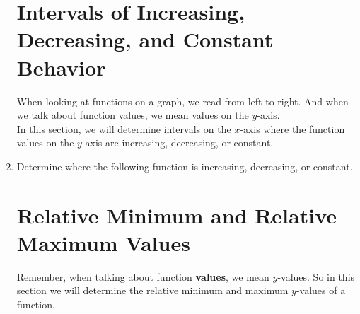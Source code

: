 \documentclass[11pt]{article}
\begin{document}
\begin{enumerate}
\section{Intervals of Increasing, Decreasing, and Constant Behavior}
When looking at functions on a graph, we read from left to right.  And when we talk about function values, we mean values on the $y$-axis.\\[.1in]

In this section, we will determine intervals on the $x$-axis where the function values on the $y$-axis are increasing, decreasing, or constant.

\item Determine where the following function is increasing, decreasing, or constant.\\

\newpage

\section{Relative Minimum and Relative Maximum Values}
Remember, when talking about function \textbf{values}, we mean $y$-values.  So in this section we will determine the relative minimum and maximum $y$-values of a function.


\end{enumerate}
\end{document}
